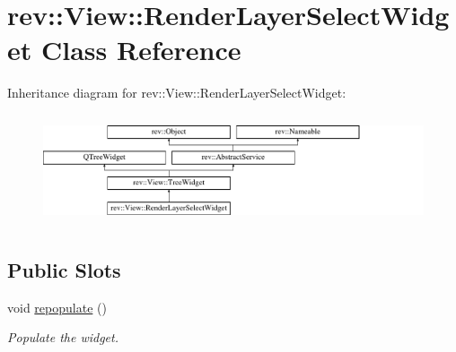 \hypertarget{classrev_1_1_view_1_1_render_layer_select_widget}{}\section{rev\+::View\+::Render\+Layer\+Select\+Widget Class Reference}
\label{classrev_1_1_view_1_1_render_layer_select_widget}
Inheritance diagram for rev\+::View\+::Render\+Layer\+Select\+Widget\+:\begin{figure}[H]
\begin{center}
\leavevmode
\includegraphics[height=3.303835cm]{classrev_1_1_view_1_1_render_layer_select_widget}
\end{center}
\end{figure}
\subsection*{Public Slots}
\begin{DoxyCompactItemize}
\item 
\mbox{\label{classrev_1_1_view_1_1_render_layer_select_widget_a227692c51cb2bebb8121709d785c132c}} 
void \mbox{\hyperlink{classrev_1_1_view_1_1_render_layer_select_widget_a227692c51cb2bebb8121709d785c132c}{repopulate}} ()
\begin{DoxyCompactList}\small\item\em Populate the widget. \end{DoxyCompactList}\end{DoxyCompactItemize}
